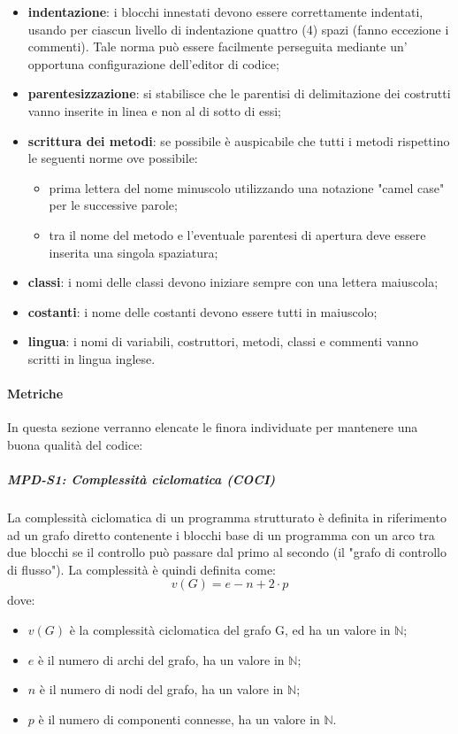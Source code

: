 \begin{itemize}
  \item \textbf{indentazione}: i blocchi innestati devono essere correttamente indentati, usando per ciascun livello di indentazione quattro (4) spazi (fanno eccezione i commenti).  Tale norma può essere facilmente perseguita mediante un' opportuna configurazione dell'editor di codice;
  \item \textbf{parentesizzazione}: si stabilisce che le parentisi di delimitazione dei costrutti vanno inserite in linea e non al di sotto di essi;
  \item \textbf{scrittura dei metodi}: se possibile è auspicabile che tutti i metodi rispettino le seguenti norme ove possibile:
        \begin{itemize}
          \item prima lettera del nome minuscolo utilizzando una notazione "camel case" per le successive parole;
          \item tra il nome del metodo e l'eventuale parentesi di apertura deve essere inserita una singola spaziatura;
        \end{itemize}
  \item \textbf{classi}: i nomi delle classi devono iniziare sempre con una lettera maiuscola;
  \item \textbf{costanti}: i nome delle costanti devono essere tutti in maiuscolo;
  \item \textbf{lingua}: i nomi di variabili, costruttori, metodi, classi e commenti vanno scritti in lingua inglese.
\end{itemize}

\paragraph{Metriche}\label{_metricheCodice}
\label{_metricheQualitaCodice}
In questa sezione verranno elencate le  finora individuate per mantenere una buona qualità del codice:

\subparagraph{MPD-S1: Complessità ciclomatica (COCI)}
La complessità ciclomatica di un programma strutturato è definita in riferimento ad un grafo diretto
contenente i blocchi base di un programma con un arco tra due blocchi se il controllo può passare dal
primo al secondo (il "grafo di controllo di flusso"). La complessità è quindi definita come:
\[
    v(G) = e − n + 2 \cdot p
\]
dove:
\begin{itemize}
    \item $v(G)$ è la complessità ciclomatica del grafo G, ed ha un valore in $\mathbb{N}$;
    \item $e$ è il numero di archi del grafo, ha un valore in $\mathbb{N}$;
    \item $n$ è il numero di nodi del grafo, ha un valore in $\mathbb{N}$;
    \item $p$ è il numero di componenti connesse, ha un valore in $\mathbb{N}$.
\end{itemize}

